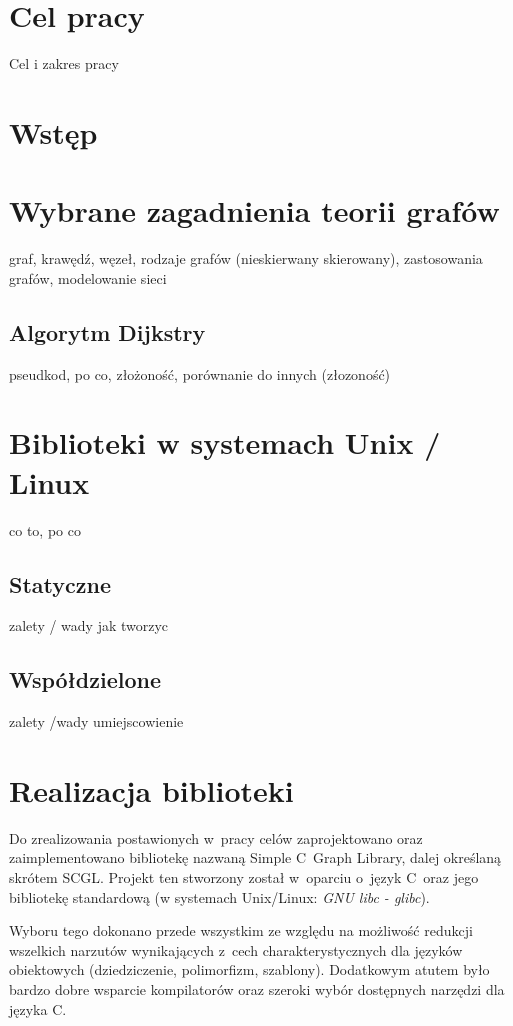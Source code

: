 \documentclass[a4paper,12pt]{thesis}
\begin{document}
\stronaTytulowa

\tableofcontents

\chapter*{Cel pracy}
Cel i zakres pracy\cite{bib:test}
\chapter*{Wstęp}
\chapter{Wybrane zagadnienia teorii grafów}
graf, krawędź, węzeł, rodzaje grafów (nieskierwany skierowany), zastosowania grafów, modelowanie sieci 
\section{Algorytm Dijkstry}
pseudkod, po co, złożoność, porównanie do innych (złozoność)
\chapter{Biblioteki w systemach Unix / Linux}
co to, po co 
\section{Statyczne}
zalety / wady jak tworzyc
\section{Współdzielone}
zalety /wady umiejscowienie
\chapter{Realizacja biblioteki}
Do zrealizowania postawionych w~pracy celów zaprojektowano oraz zaimplementowano bibliotekę nazwaną Simple C~Graph Library, dalej określaną skrótem SCGL. 
Projekt ten stworzony został w~oparciu o~język C~oraz jego bibliotekę standardową (w systemach Unix/Linux: \emph{GNU libc - glibc}).

Wyboru tego dokonano przede wszystkim ze względu na możliwość redukcji wszelkich narzutów wynikających z~cech charakterystycznych dla języków obiektowych (dziedziczenie, polimorfizm, szablony). 
Dodatkowym atutem było bardzo dobre wsparcie kompilatorów oraz szeroki wybór dostępnych narzędzi dla języka C.
\end{document}
